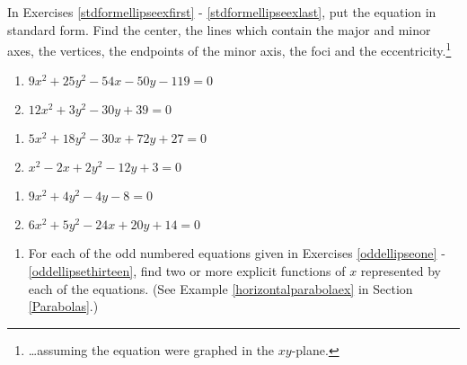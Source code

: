 \documentclass{ximera}
\begin{document}
In Exercises \ref{stdformellipseexfirst} - \ref{stdformellipseexlast}, put the equation in standard form.   Find the center, the lines which contain the major and minor axes, the vertices, the endpoints of the minor axis, the foci and the eccentricity.\footnote{\ldots assuming the equation were graphed in the $xy$-plane.}

\begin{multicols}{2}
\begin{enumerate}
\setcounter{enumi}{\value{HW}}

\item $9x^2+25y^2-54x-50y-119=0$  \label{stdformellipseexfirst}   \label{oddellipsenine}
\item $12x^{2} + 3y^{2} - 30y + 39 = 0$

\setcounter{HW}{\value{enumi}}
\end{enumerate}
\end{multicols}

\begin{multicols}{2}
\begin{enumerate}
\setcounter{enumi}{\value{HW}}

\item $5x^{2} + 18y^{2} - 30x + 72y + 27 = 0$   \label{oddellipseeleven}
\item $x^2 - 2x + 2y^2 - 12y + 3 = 0$


\setcounter{HW}{\value{enumi}}
\end{enumerate}
\end{multicols}

\begin{multicols}{2}
\begin{enumerate}
\setcounter{enumi}{\value{HW}}

\item $9x^2 + 4y^2 - 4y - 8 = 0$   \label{oddellipsethirteen}
\item $6x^2+5y^2-24x+20y+14=0$  \label{stdformellipseexlast}

\setcounter{HW}{\value{enumi}}
\end{enumerate}
\end{multicols}

\begin{enumerate}
\setcounter{enumi}{\value{HW}}

\item For each of the odd numbered equations given in Exercises \ref{oddellipseone} - \ref{oddellipsethirteen}, find two or more explicit functions of $x$ represented by each of the equations.  (See Example \ref{horizontalparabolaex} in Section \ref{Parabolas}.)

\setcounter{HW}{\value{enumi}}
\end{enumerate}
\end{document}
